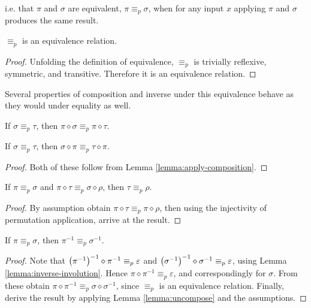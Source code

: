 i.e. that \(\pi\) and \(\sigma\) are equivalent, \(\pi \equiv_p \sigma\),  when for any input \(x\) applying \(\pi\) and \(\sigma\) produces the same result.

\begin{lemma}
\(\equiv_p\) is an equivalence relation.
\end{lemma}
\begin{proof}
Unfolding the definition of equivalence, \(\equiv_p\) is trivially reflexive, symmetric, and transitive.
Therefore it is an equivalence relation.
\end{proof}

Several properties of composition and inverse under this equivalence behave as they would under equality as well.

\begin{lemma}
If \(\sigma \equiv_p \tau\), then \(\pi \diamond \sigma \equiv_p \pi \diamond \tau\).
\end{lemma}
\begin{lemma}
If \(\sigma \equiv_p \tau\), then \(\sigma \diamond \pi \equiv_p \tau \diamond \pi\).
\end{lemma}
\begin{proof}
Both of these follow from Lemma \ref{lemma:apply-composition}.
\end{proof}

\begin{lemma}
\label{lemma:uncompose}
If \(\pi \equiv_p \sigma\) and \(\pi \diamond \tau \equiv_p \sigma \diamond \rho\),
then \(\tau \equiv_p \rho\).
\end{lemma}
\begin{proof}
By assumption obtain \(\pi \diamond \tau \equiv_p \pi \diamond \rho\), then using the injectivity of permutation application, arrive at the result.
\end{proof}

\begin{lemma}
If \(\pi \equiv_p \sigma\), then \(\pi^{-1} \equiv_p \sigma^{-1}\).
\end{lemma}
\begin{proof}
Note that \(\left(\pi^{-1}\right)^{-1} \diamond \pi^{-1} \equiv_p \varepsilon\) and \(\left(\sigma^{-1}\right)^{-1} \diamond \sigma^{-1} \equiv_p \varepsilon\), using Lemma \ref{lemma:inverse-involution}.
Hence \(\pi \diamond \pi^{-1} \equiv_p \varepsilon\), and correspondingly for \(\sigma\).
From these obtain \(\pi \diamond \pi^{-1} \equiv_p \sigma \diamond \sigma^{-1}\), since \(\equiv_p\) is an equivalence relation.
Finally, derive the result by applying Lemma \ref{lemma:uncompose} and the assumptions.
\end{proof}


